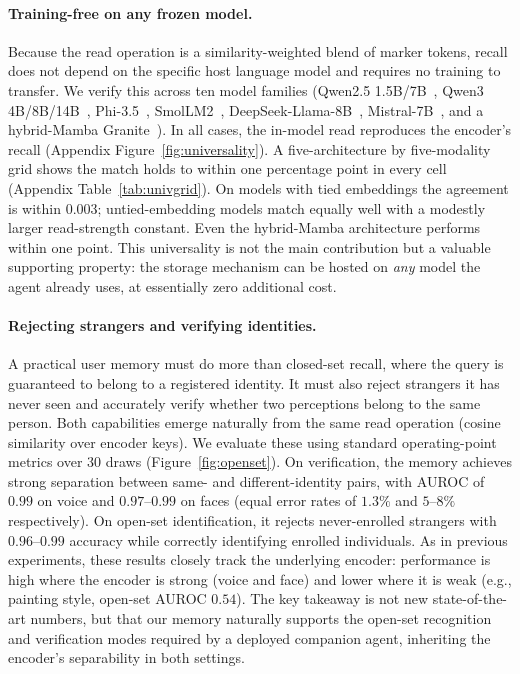\paragraph{Training-free on any frozen model.} Because the read operation is a similarity-weighted blend of marker tokens, recall does not depend on the specific host language model and requires no training to transfer. We verify this across ten model families (Qwen2.5 1.5B/7B~\citep{qwen25}, Qwen3 4B/8B/14B~\citep{qwen3}, Phi-3.5~\citep{phi3}, SmolLM2~\citep{smollm2}, DeepSeek-Llama-8B~\citep{deepseekr1}, Mistral-7B~\citep{mistral7b}, and a hybrid-Mamba Granite~\citep{granite4}). In all cases, the in-model read reproduces the encoder's recall (Appendix Figure~\ref{fig:universality}). A five-architecture by five-modality grid shows the match holds to within one percentage point in every cell (Appendix Table~\ref{tab:univgrid}). On models with tied embeddings the agreement is within $0.003$; untied-embedding models match equally well with a modestly larger read-strength constant. Even the hybrid-Mamba architecture performs within one point. This universality is not the main contribution but a valuable supporting property: the storage mechanism can be hosted on \emph{any} model the agent already uses, at essentially zero additional cost.

\paragraph{Rejecting strangers and verifying identities.} A practical user memory must do more than closed-set recall, where the query is guaranteed to belong to a registered identity. It must also reject strangers it has never seen and accurately verify whether two perceptions belong to the same person. Both capabilities emerge naturally from the same read operation (cosine similarity over encoder keys). We evaluate these using standard operating-point metrics over $30$ draws (Figure~\ref{fig:openset}). On verification, the memory achieves strong separation between same- and different-identity pairs, with AUROC of $0.99$ on voice and $0.97$--$0.99$ on faces (equal error rates of $1.3\%$ and $5$--$8\%$ respectively). On open-set identification, it rejects never-enrolled strangers with $0.96$--$0.99$ accuracy while correctly identifying enrolled individuals. As in previous experiments, these results closely track the underlying encoder: performance is high where the encoder is strong (voice and face) and lower where it is weak (e.g., painting style, open-set AUROC $0.54$). The key takeaway is not new state-of-the-art numbers, but that our memory naturally supports the open-set recognition and verification modes required by a deployed companion agent, inheriting the encoder's separability in both settings.


